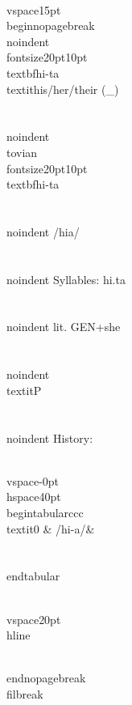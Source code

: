 \\vspace{15pt}
\\begin{nopagebreak}
\\noindent{\\fontsize{20pt}{10pt}\\textbf{hi-ta} } \\textit{his/her/their} (_)\\\\
\\noindent {\\tovian \\fontsize{20pt}{10pt} \\textbf{hi-ta} }\\\\
\\noindent /h{\textprimstress}i{}a/\\\\
\\noindent Syllables: hi.ta\\\\
\\noindent lit. GEN+she\\\\
\\noindent \\textit{P}\\\\


\\noindent History:

\\vspace{-0pt}
\\hspace{40pt}
\\begin{tabular}{ccc}
\\textit{0} & /hi-{}a/& \\\\
\\end{tabular}

\\vspace{20pt}\\hline

\\end{nopagebreak}
\\filbreak



